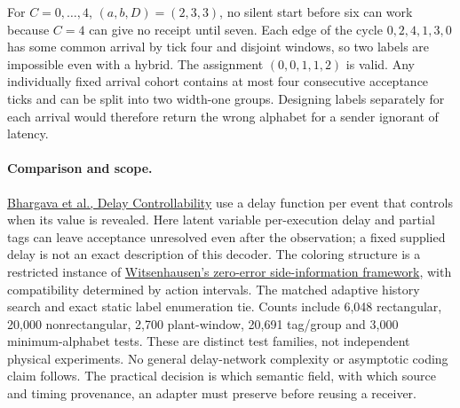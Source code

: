 \documentclass[11pt]{article}
\begin{document}
For $C=0,\ldots,4$, $(a,b,D)=(2,3,3)$, no silent start before six can
work because $C=4$ can give no receipt until seven. Each edge of the
cycle $0,2,4,1,3,0$ has some common arrival by tick four and disjoint
windows, so two labels are impossible even with a hybrid. The assignment
$(0,0,1,1,2)$ is valid. Any individually fixed arrival cohort contains
at most four consecutive acceptance ticks and can be split into two
width-one groups. Designing labels separately for each arrival would
therefore return the wrong alphabet for a sender ignorant of latency.

\paragraph{Comparison and scope.}
\href{https://mers-papers.csail.mit.edu/Other/2018%20CSAIL%20TR%20Bhargava%20Delay%20Controllability/TR%20delay-controllability.pdf}{Bhargava et al., Delay Controllability}
use a delay function per event that controls when its value is revealed.
Here latent variable per-execution delay and partial tags can leave
acceptance unresolved even after the observation; a fixed supplied delay
is not an exact description of this decoder. The coloring structure is
a restricted instance of \href{https://doi.org/10.1109/TIT.1976.1055607}{Witsenhausen's zero-error side-information framework},
with compatibility determined by action intervals. The matched adaptive
history search and exact static label enumeration tie. Counts include
6,048 rectangular, 20,000 nonrectangular, 2,700 plant-window, 20,691
tag/group and 3,000 minimum-alphabet tests. These are distinct test
families, not independent physical experiments. No general delay-network
complexity or asymptotic coding claim follows. The practical decision is
which semantic field, with which source and timing provenance, an
adapter must preserve before reusing a receiver.
\end{document}
